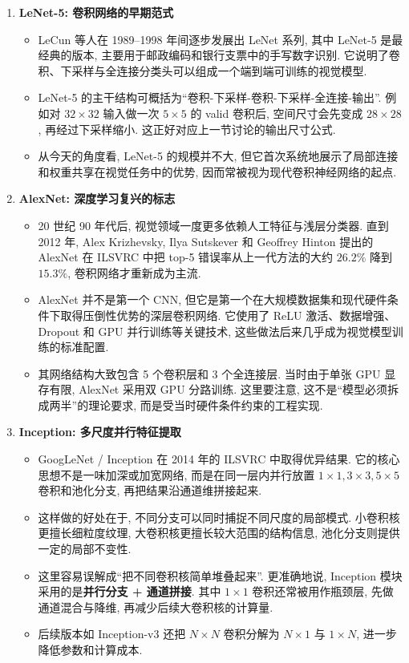 \documentclass{../nndlcourse}
\begin{document}
\begin{enumerate}
    \item \textbf{LeNet-5: 卷积网络的早期范式}
    \begin{itemize}
        \item LeCun 等人在 1989--1998 年间逐步发展出 LeNet 系列, 其中 LeNet-5 是最经典的版本, 主要用于邮政编码和银行支票中的手写数字识别. 它说明了卷积、下采样与全连接分类头可以组成一个端到端可训练的视觉模型.
        \item LeNet-5 的主干结构可概括为“卷积-下采样-卷积-下采样-全连接-输出”. 例如对 $32 \times 32$ 输入做一次 $5 \times 5$ 的 valid 卷积后, 空间尺寸会先变成 $28 \times 28$, 再经过下采样缩小. 这正好对应上一节讨论的输出尺寸公式.
        \item 从今天的角度看, LeNet-5 的规模并不大, 但它首次系统地展示了局部连接和权重共享在视觉任务中的优势, 因而常被视为现代卷积神经网络的起点.
    \end{itemize}

    \item \textbf{AlexNet: 深度学习复兴的标志}
    \begin{itemize}
        \item 20 世纪 90 年代后, 视觉领域一度更多依赖人工特征与浅层分类器. 直到 2012 年, Alex Krizhevsky, Ilya Sutskever 和 Geoffrey Hinton 提出的 AlexNet 在 ILSVRC 中把 top-5 错误率从上一代方法的大约 $26.2\%$ 降到 $15.3\%$, 卷积网络才重新成为主流.
        \item AlexNet 并不是第一个 CNN, 但它是第一个在大规模数据集和现代硬件条件下取得压倒性优势的深层卷积网络. 它使用了 ReLU 激活、数据增强、Dropout 和 GPU 并行训练等关键技术, 这些做法后来几乎成为视觉模型训练的标准配置.
        \item 其网络结构大致包含 5 个卷积层和 3 个全连接层. 当时由于单张 GPU 显存有限, AlexNet 采用双 GPU 分路训练. 这里要注意, 这不是“模型必须拆成两半”的理论要求, 而是受当时硬件条件约束的工程实现.
    \end{itemize}

    \item \textbf{Inception: 多尺度并行特征提取}
    \begin{itemize}
        \item GoogLeNet / Inception 在 2014 年的 ILSVRC 中取得优异结果. 它的核心思想不是一味加深或加宽网络, 而是在同一层内并行放置 $1 \times 1, 3 \times 3, 5 \times 5$ 卷积和池化分支, 再把结果沿通道维拼接起来.
        \item 这样做的好处在于, 不同分支可以同时捕捉不同尺度的局部模式. 小卷积核更擅长细粒度纹理, 大卷积核更擅长较大范围的结构信息, 池化分支则提供一定的局部不变性.
        \item 这里容易误解成“把不同卷积核简单堆叠起来”. 更准确地说, Inception 模块采用的是\textbf{并行分支 + 通道拼接}. 其中 $1 \times 1$ 卷积还常被用作瓶颈层, 先做通道混合与降维, 再减少后续大卷积核的计算量.
        \item 后续版本如 Inception-v3 还把 $N \times N$ 卷积分解为 $N \times 1$ 与 $1 \times N$, 进一步降低参数和计算成本.
    \end{itemize}


\end{enumerate}
\end{document}
